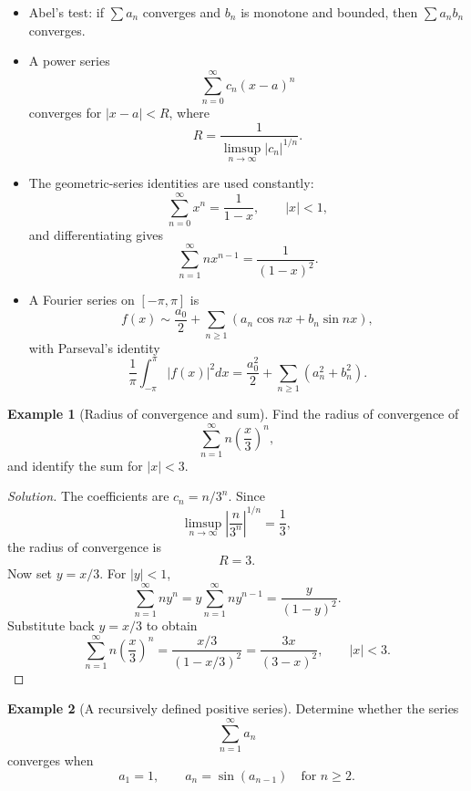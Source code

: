 \documentclass[11pt]{article}
\theoremstyle{definition}
\newtheorem{example}{Example}[section]
\begin{document}
\begin{itemize}
    \item Abel's test: if $\sum a_n$ converges and $b_n$ is monotone and bounded, then $\sum a_n b_n$ converges.
    \item A power series
    \[
        \sum_{n=0}^{\infty} c_n (x-a)^n
    \]
    converges for $|x-a|<R$, where
    \[
        R = \frac{1}{\limsup_{n\to\infty} |c_n|^{1/n}}.
    \]
    \item The geometric-series identities are used constantly:
    \[
        \sum_{n=0}^{\infty} x^n = \frac{1}{1-x}, \qquad |x|<1,
    \]
    and differentiating gives
    \[
        \sum_{n=1}^{\infty} n x^{n-1}=\frac{1}{(1-x)^2}.
    \]
    \item A Fourier series on $[-\pi,\pi]$ is
    \[
        f(x) \sim \frac{a_0}{2} + \sum_{n\ge 1}(a_n\cos nx + b_n\sin nx),
    \]
    with Parseval's identity
    \[
        \frac{1}{\pi}\int_{-\pi}^{\pi}|f(x)|^2dx = \frac{a_0^2}{2}+\sum_{n\ge 1}(a_n^2+b_n^2).
    \]
\end{itemize}

\begin{example}[Radius of convergence and sum]
Find the radius of convergence of
\[
\sum_{n=1}^{\infty} n\left(\frac{x}{3}\right)^n,
\]
and identify the sum for $|x|<3$.
\end{example}

\begin{proof}[Solution]
The coefficients are $c_n=n/3^n$. Since
\[
\limsup_{n\to\infty} \left|\frac{n}{3^n}\right|^{1/n}=\frac{1}{3},
\]
the radius of convergence is
\[
R=3.
\]
Now set $y=x/3$. For $|y|<1$,
\[
\sum_{n=1}^{\infty} n y^n = y\sum_{n=1}^{\infty} n y^{n-1} = \frac{y}{(1-y)^2}.
\]
Substitute back $y=x/3$ to obtain
\[
\sum_{n=1}^{\infty} n\left(\frac{x}{3}\right)^n = \frac{x/3}{(1-x/3)^2} = \frac{3x}{(3-x)^2}, \qquad |x|<3.
\]
\end{proof}

\begin{example}[A recursively defined positive series]
Determine whether the series
\[
\sum_{n=1}^{\infty} a_n
\]
converges when
\[
a_1=1, \qquad a_{n}=\sin(a_{n-1}) \quad \text{for } n\ge 2.
\]
\end{example}
\end{document}
